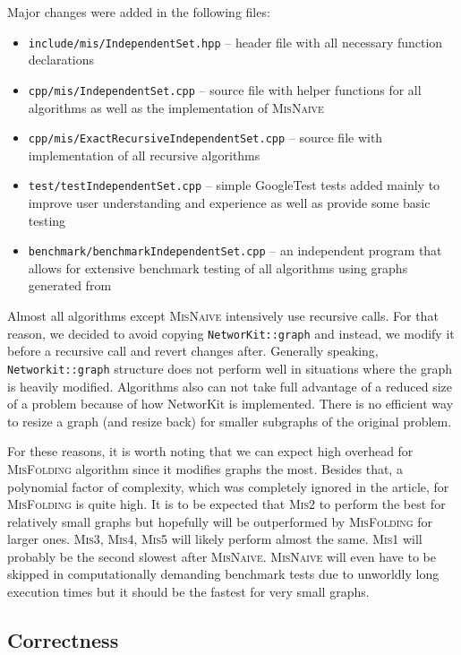 Major changes were added in the following files:
\begin{itemize}  [noitemsep]
    \item \texttt{include/mis/IndependentSet.hpp} -- header file with all necessary function declarations
    \item \texttt{cpp/mis/IndependentSet.cpp} -- source file with helper functions for all algorithms as well as the implementation of \textsc{MisNaive}
    \item \texttt{cpp/mis/ExactRecursiveIndependentSet.cpp} -- source file with implementation of all recursive algorithms
    \item \texttt{test/testIndependentSet.cpp} -- simple GoogleTest tests added mainly to improve user understanding and experience as well as provide some basic testing
    \item \texttt{benchmark/benchmarkIndependentSet.cpp} -- an independent program that allows for extensive benchmark testing of all algorithms using graphs generated from \cite{benchmark}
\end{itemize}

Almost all algorithms except \textsc{MisNaive} intensively use recursive calls. For that reason, we decided to avoid copying \texttt{NetworKit::graph} and instead, we modify it before a recursive call and revert changes after. Generally speaking, \texttt{Networkit::graph} structure does not perform well in situations where the graph is heavily modified. Algorithms also can not take full advantage of a reduced size of a problem because of how NetworKit is implemented. There is no efficient way to resize a graph (and resize back) for smaller subgraphs of the original problem.

For these reasons, it is worth noting that we can expect high overhead for \textsc{MisFolding} algorithm since it modifies graphs the most. Besides that, a polynomial factor of complexity, which was completely ignored in the article, for \textsc{MisFolding} is quite high. It is to be expected that \textsc{Mis2} to perform the best for relatively small graphs but hopefully will be outperformed by \textsc{MisFolding} for larger ones. \textsc{Mis3}, \textsc{Mis4}, \textsc{Mis5} will likely perform almost the same. \textsc{Mis1} will probably be the second slowest after \textsc{MisNaive}. \textsc{MisNaive} will even have to be skipped in computationally demanding benchmark tests due to unworldly long execution times but it should be the fastest for very small graphs.

\subsection{Correctness}


